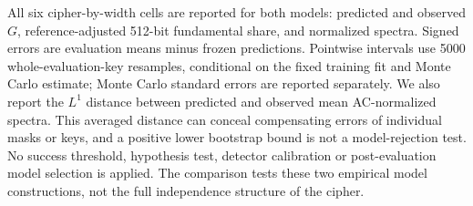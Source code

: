 All six cipher-by-width cells are reported for both models: predicted and observed $G$, reference-adjusted 512-bit fundamental share, and normalized spectra. Signed errors are evaluation means minus frozen predictions. Pointwise intervals use 5000 whole-evaluation-key resamples, conditional on the fixed training fit and Monte Carlo estimate; Monte Carlo standard errors are reported separately. We also report the $L^1$ distance between predicted and observed mean AC-normalized spectra. This averaged distance can conceal compensating errors of individual masks or keys, and a positive lower bootstrap bound is not a model-rejection test. No success threshold, hypothesis test, detector calibration or post-evaluation model selection is applied. The comparison tests these two empirical model constructions, not the full independence structure of the cipher.
